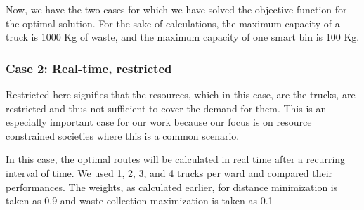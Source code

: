 \documentclass[12pt]{article}
\begin{document}
Now, we have the two cases for which we have solved the objective function for the optimal solution. For the sake of calculations, the maximum capacity of a truck is 1000 Kg of waste, and the maximum capacity of one smart bin is 100 Kg.

\subsubsection*{Case 2: Real-time, restricted}
Restricted here signifies that the resources, which in this case, are the trucks, are restricted and thus not sufficient to cover the demand for them. This is an especially important case for our work because our focus is on resource constrained societies where this is a common scenario.

In this case, the optimal routes will be calculated in real time after a recurring interval of time. We used 1, 2, 3, and 4 trucks per ward and compared their performances. The weights, as calculated earlier, for distance minimization is taken as 0.9 and waste collection maximization is taken as 0.1
\end{document}
